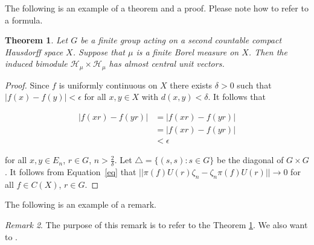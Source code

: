 \documentclass[12pt, reqno]{amsart}
\newtheorem{theorem}{Theorem}[section]
\theoremstyle{definition}
\theoremstyle{remark}
\newtheorem{remark}[theorem]{Remark}
\numberwithin{equation}{section}
\begin{document}

The following is an example of a theorem and a proof. Please note how to refer to a formula.


\begin{theorem}\label{theo1}
Let $G$ be a finite group acting on a second countable compact Hausdorff space $X$. Suppose that $\mu$ is a finite Borel measure on $X$. Then the induced bimodule $\mathcal{H}_\mu\times \mathcal{H}_\mu$ has almost central unit vectors.
\end{theorem}


\begin{proof}
Since $f$ is uniformly continuous on $X$ there exists $\delta>0$ such that $|f(x)-f(y)|<\epsilon$ for all $x,y\in X$ with $d(x,y)<\delta$. It follows that

\begin{align}\label{eq}
|f(xr)-f(yr)|&=|f(xr)-f(yr)|\nonumber\\
&=|f(xr)-f(yr)|\nonumber\\
&< \epsilon
\end{align}



for all $x,y\in E_n$, $r\in G$, $n>\frac{2}{\delta}$. Let $\bigtriangleup = \{(s, s): s\in G\}$ be the diagonal of $G\times G$. It follows from Equation~\eqref{eq} that  $||\pi(f)U(r)\zeta_n-\zeta_n\pi(f)U(r)||\rightarrow 0$ for all $f\in C(X)$, $r\in G$.
\end{proof}


The following is an example of a remark.


\begin{remark}
The purpose of this remark is to refer to the Theorem
\ref{theo1}. We also want to \cite{Brown, Connes}. 
\end{remark}

\end{document}
